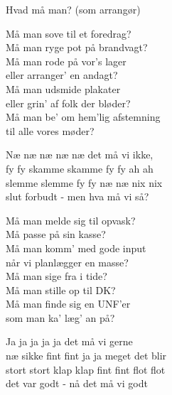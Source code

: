\begin{song}{Hvad må man? (som arrangør)}

  \begin{SBVerse}
    Må man sove til et foredrag?\\
    Må man ryge pot på brandvagt?\\
    Må man rode på vor’s lager\\
    eller arranger’ en andagt?\\\medskip
    Må man udsmide plakater\\
    eller grin’ af folk der bløder?\\
    Må man be’ om hem’lig afstemning\\
    til alle vores møder?
  \end{SBVerse}

  \begin{SBChorus}
    Næ næ næ næ næ det må vi ikke,\\
    fy fy skamme skamme fy fy ah ah\\
    slemme slemme fy fy næ næ nix nix\\
    slut forbudt - men hva må vi så?
  \end{SBChorus}


  \begin{SBVerse}
    Må man melde sig til opvask?\\
    Må passe på sin kasse?\\
    Må man komm’ med gode input\\
    når vi planlægger en masse?\\\medskip
    Må man sige fra i tide?\\
    Må man stille op til DK?\\
    Må man finde sig en UNF’er\\
    som man ka’ læg’ an på?
  \end{SBVerse}

  \begin{SBChorus}
    Ja ja ja ja ja det må vi gerne\\
    næ sikke fint fint ja ja meget det blir\\
    stort stort klap klap fint fint flot flot\\
    det var godt - nå det må vi godt
  \end{SBChorus}
\end{song}